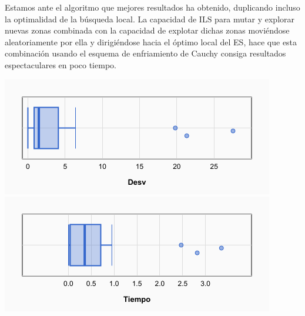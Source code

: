 \documentclass[a4paper, 12pt]{article}
\begin{document}
	Estamos ante el algoritmo que mejores resultados ha obtenido, duplicando incluso la optimalidad de la búsqueda local. La capacidad de ILS para mutar y explorar nuevas zonas combinada con la capacidad de explotar dichas zonas moviéndose aleatoriamente por ella y dirigiéndose hacia el óptimo local del ES, hace que esta combinación usando el esquema de enfriamiento de Cauchy consiga resultados espectaculares en poco tiempo.

	\begin{center}
         \includegraphics[scale=0.5]{desv-ilsEsCauchy}
         \includegraphics[scale=0.5]{time-ilsEsCauchy}
      \end{center}
\end{document}
